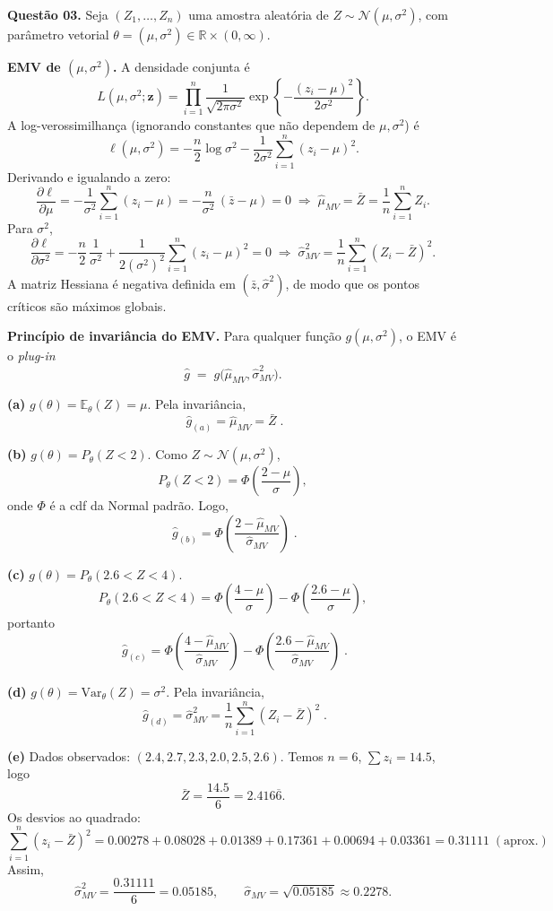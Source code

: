 \textbf{Questão 03.} Seja $(Z_1,\ldots,Z_n)$ uma amostra aleatória de
$Z\sim\mathcal N(\mu,\sigma^2)$, com parâmetro vetorial
$\theta=(\mu,\sigma^2)\in\mathbb R\times(0,\infty)$.

\medskip
\textbf{EMV de $(\mu,\sigma^2)$.}
A densidade conjunta é
\[
L(\mu,\sigma^2;\mathbf z)=
\prod_{i=1}^n \frac{1}{\sqrt{2\pi\sigma^2}}
\exp\!\left\{-\frac{(z_i-\mu)^2}{2\sigma^2}\right\}.
\]
A log-verossimilhança (ignorando constantes que não dependem de $\mu,\sigma^2$) é
\[
\ell(\mu,\sigma^2)
= -\frac{n}{2}\log\sigma^2
  -\frac{1}{2\sigma^2}\sum_{i=1}^n (z_i-\mu)^2 .
\]
Derivando e igualando a zero:
\[
\frac{\partial \ell}{\partial \mu}
= -\frac{1}{\sigma^2}\sum_{i=1}^n (z_i-\mu)
= -\frac{n}{\sigma^2}\,(\bar z-\mu)=0
\;\Longrightarrow\;
\widehat\mu_{MV}=\bar Z=\frac{1}{n}\sum_{i=1}^n Z_i.
\]
Para $\sigma^2$,
\[
\frac{\partial \ell}{\partial \sigma^2}
= -\frac{n}{2}\,\frac{1}{\sigma^2}
  +\frac{1}{2(\sigma^2)^2}\sum_{i=1}^n (z_i-\mu)^2
  =0
\;\Longrightarrow\;
\widehat\sigma^2_{MV}
=\frac{1}{n}\sum_{i=1}^n (Z_i-\bar Z)^2.
\]
A matriz Hessiana é negativa definida em $(\bar z,\widehat\sigma^2)$, de modo que os pontos críticos são máximos globais.

\medskip
\textbf{Princípio de invariância do EMV.}
Para qualquer função $g(\mu,\sigma^2)$, o EMV é o \emph{plug-in}
\[
\widehat g \;=\; g\big(\widehat\mu_{MV},\widehat\sigma^2_{MV}\big).
\]

\bigskip
\textbf{(a) } $g(\theta)=\mathbb E_\theta(Z)=\mu$.
Pela invariância,
\[
\boxed{\;\widehat g_{(a)}=\widehat\mu_{MV}=\bar Z\; }.
\]

\bigskip
\textbf{(b) } $g(\theta)=P_\theta(Z<2)$.
Como $Z\sim\mathcal N(\mu,\sigma^2)$,
\[
P_\theta(Z<2)=\Phi\!\left(\frac{2-\mu}{\sigma}\right),
\]
onde $\Phi$ é a cdf da Normal padrão. Logo,
\[
\boxed{\;\widehat g_{(b)}
=\Phi\!\left(\dfrac{2-\widehat\mu_{MV}}{\widehat\sigma_{MV}}\right)\; }.
\]

\bigskip
\textbf{(c) } $g(\theta)=P_\theta(2.6<Z<4)$.
\[
P_\theta(2.6<Z<4)=
\Phi\!\left(\frac{4-\mu}{\sigma}\right)-
\Phi\!\left(\frac{2.6-\mu}{\sigma}\right),
\]
portanto
\[
\boxed{\;\widehat g_{(c)}
=\Phi\!\left(\dfrac{4-\widehat\mu_{MV}}{\widehat\sigma_{MV}}\right)-
 \Phi\!\left(\dfrac{2.6-\widehat\mu_{MV}}{\widehat\sigma_{MV}}\right)\; }.
\]

\bigskip
\textbf{(d) } $g(\theta)=\mathrm{Var}_\theta(Z)=\sigma^2$.
Pela invariância,
\[
\boxed{\;\widehat g_{(d)}=\widehat\sigma^2_{MV}
=\dfrac{1}{n}\sum_{i=1}^n (Z_i-\bar Z)^2\; }.
\]

\bigskip
\textbf{(e) } Dados observados: $(2.4, 2.7, 2.3, 2.0, 2.5, 2.6)$.
Temos $n=6$, $\sum z_i=14.5$, logo
\[
\bar Z=\frac{14.5}{6}=2.416\overline{6}.
\]
Os desvios ao quadrado:
\[
\sum_{i=1}^n (z_i-\bar Z)^2
=0.00278+0.08028+0.01389+0.17361+0.00694+0.03361
=0.31111\;(\text{aprox.})
\]
Assim,
\[
\widehat\sigma^2_{MV}=\frac{0.31111}{6}=0.05185,\qquad
\widehat\sigma_{MV}=\sqrt{0.05185}\approx 0.2278.
\]

